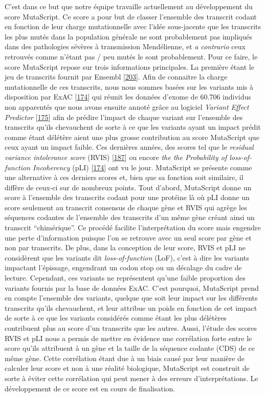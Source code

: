 \documentclass[12pt,a4paper,twoside]{ugathesis}
\theoremstyle{definition}
\theoremstyle{definition}
\theoremstyle{definition}
\theoremstyle{remark}
\begin{document}
C'est dans ce but que notre équipe travaille actuellement au
développement du score MutaScript. Ce score a pour but de classer
l'ensemble des transcrit codant en fonction de leur charge mutationnelle
avec l'idée sous-jacente que les transcrits les plus mutés dans la
population générale ne sont probablement pas impliqués dans des
pathologies sévères à transmission Mendélienne, et \emph{a contrario}
ceux retrouvés comme n'étant pas / peu mutés le sont probablement. Pour
ce faire, le score MutaScript repose sur trois informations principales.
La première étant le jeu de transcrits fournit par Ensembl
{[}\protect\hyperlink{ref-Aken2017}{203}{]}. Afin de connaitre la charge
mutationnelle de ces transcrits, nous nous sommes basées sur les
variants mis à disposition par ExAC
{[}\protect\hyperlink{ref-Lek2016}{174}{]} qui réunit les données
d'exome de 60.706 individus non apparentés que nous avons ensuite annoté
grâce au logiciel \emph{Variant Effect Predictor}
{[}\protect\hyperlink{ref-McLaren2016}{175}{]} afin de prédire l'impact
de chaque variant sur l'ensemble des transcrits qu'ils chevauchent de
sorte à ce que les variants ayant un impact prédit comme étant délétère
aient une plus grosse contribution au score MutaScript que ceux ayant un
impact faible. Ces dernières années, des scores tel que le
\emph{residual variance intolerance score} (RVIS)
{[}\protect\hyperlink{ref-Petrovski2013}{187}{]} ou encore \emph{the the
Probability of loss-of-function Incoherency} (pLI)
{[}\protect\hyperlink{ref-Lek2016}{174}{]} ont vu le jour. MutaScript se
présente comme une alternative à ces derniers scores et, bien que sa
fonction soit similaire, il diffère de ceux-ci sur de nombreux points.
Tout d'abord, MutaScript donne un score à l'ensemble des transcrits
codant pour une protéine là où pLI donne un score seulement au transcrit
consensus de chaque gène et RVIS qui agrège les séquences codantes de
l'ensemble des transcrits d'un même gène créant ainsi un transcrit
``chimérique''. Ce procédé facilite l'interprétation du score mais
engendre une perte d'information puisque l'on se retrouve avec un seul
score par gène et non par transcrits. De plus, dans la conception de
leur score, RVIS et pLI ne considèrent que les variants dit
\emph{loss-of-function} (LoF), c'est à dire les variants impactant
l'épissage, engendrant un codon stop ou un décalage du cadre de lecture.
Cependant, ces variants ne représentent qu'une faible proportion des
variants fournis par la base de données ExAC. C'est pourquoi, MutaScript
prend en compte l'ensemble des variants, quelque que soit leur impact
sur les différents transcrits qu'ils chevauchent, et leur attribue un
poids en fonction de cet impact de sorte à ce que les variants
considérés comme étant les plus délétères contribuent plus au score d'un
transcrits que les autres. Aussi, l'étude des scores RVIS et pLI nous a
permis de mettre en évidence une corrélation forte entre le score qu'ils
attribuent à un gène et la taille de la séquence codante (CDS) de ce
même gène. Cette corrélation étant due à un biais causé par leur manière
de calculer leur score et non à une réalité biologique, MutaScript est
construit de sorte à éviter cette corrélation qui peut mener à des
erreurs d'interprétations. Le développement de ce score est en cours de
finalisation.
\end{document}
